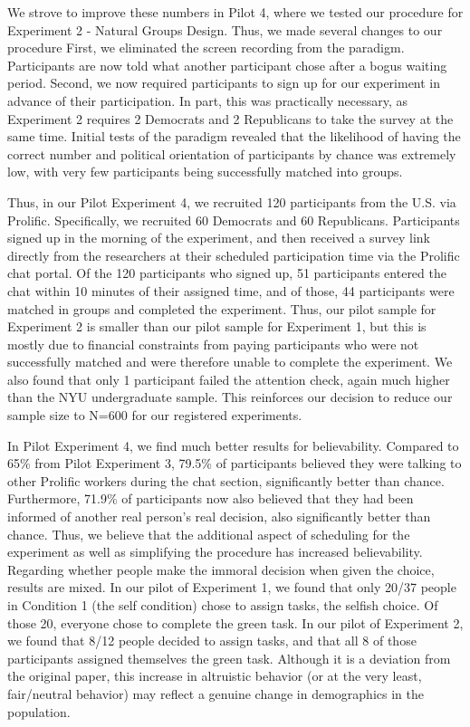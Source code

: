 \documentclass[12pt,]{article}
\begin{document}
We strove to improve these numbers in Pilot 4, where we tested our procedure for Experiment 2 - Natural Groups Design. Thus, we made several changes to our procedure First, we eliminated the screen recording from the paradigm. Participants are now told what another participant chose after a bogus waiting period. Second, we now required participants to sign up for our experiment in advance of their participation. In part, this was practically necessary, as Experiment 2 requires 2 Democrats and 2 Republicans to take the survey at the same time. Initial tests of the paradigm revealed that the likelihood of having the correct number and political orientation of participants by chance was extremely low, with very few participants being successfully matched into groups. 

Thus, in our Pilot Experiment 4, we recruited 120 participants from the U.S. via Prolific. Specifically, we recruited 60 Democrats and 60 Republicans. Participants signed up in the morning of the experiment, and then received a survey link directly from the researchers at their scheduled participation time via the Prolific chat portal. Of the 120 participants who signed up, 51 participants entered the chat within 10 minutes of their assigned time, and of those, 44 participants were matched in groups and completed the experiment. Thus, our pilot sample for Experiment 2 is smaller than our pilot sample for Experiment 1, but this is mostly due to financial constraints from paying participants who were not successfully matched and were therefore unable to complete the experiment. We also found that only 1 participant failed the attention check, again much higher than the NYU undergraduate sample. This reinforces our decision to reduce our sample size to N=600 for our registered experiments.

In Pilot Experiment 4, we find much better results for believability. Compared to 65\% from Pilot Experiment 3, 79.5\% of participants believed they were talking to other Prolific workers during the chat section, significantly better than chance. Furthermore, 71.9\% of participants now also believed that they had been informed of another real person’s real decision, also significantly better than chance. Thus, we believe that the additional aspect of scheduling for the experiment as well as simplifying the procedure has increased believability. 
Regarding whether people make the immoral decision when given the choice, results are mixed. In our pilot of Experiment 1, we found that only 20/37 people in Condition 1 (the self condition) chose to assign tasks, the selfish choice. Of those 20, everyone chose to complete the green task. In our pilot of Experiment 2, we found that 8/12 people decided to assign tasks, and that all 8 of those participants assigned themselves the green task.  Although it is a deviation from the original paper, this increase in altruistic behavior (or at the very least, fair/neutral behavior) may reflect a genuine change in demographics in the population.
\end{document}
